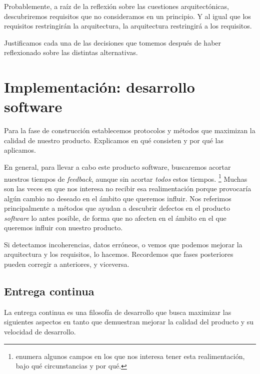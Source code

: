 Probablemente, a raíz de la reflexión sobre las cuestiones arquitectónicas, descubriremos
requisitos que no consideramos en un principio. Y al igual que los requisitos restringirán la arquitectura, la arquitectura
restringirá a los requisitos.

Justificamos cada una de las decisiones que tomemos después de haber reflexionado sobre las
distintas alternativas. 


\section{Implementación: desarrollo software}

Para la fase de construcción establecemos protocolos y métodos que maximizan
la calidad de nuestro producto. Explicamos en qué consisten y por qué las
aplicamos.

En general, para llevar a cabo este producto software, buscaremos acortar nuestros
tiempos de \textit{feedback}, aunque sin acortar \textit{todos} estos tiempos.%
\footnote{%
    \cite[Chapter 5: Feedback]{ModernSoftwareEngineering} enumera algunos campos en los
    que nos interesa tener esta realimentación, bajo qué circunstancias y por qué.
}%
 Muchas son las
veces en que nos interesa no recibir esa realimentación porque provocaría
algún cambio no deseado en el ámbito que queremos influir. Nos referimos
principalmente a métodos que ayudan a descubrir defectos en el producto
\textit{software} lo antes posible, de forma que no afecten en el ámbito en el que
queremos influir con nuestro producto.

Si detectamos incoherencias, datos erróneos, o vemos que podemos mejorar
la arquitectura y los requisitos, lo hacemos. Recordemos que fases posteriores
pueden corregir a anteriores, y viceversa.

\subsection{Entrega continua}

La entrega continua es una filosofía de desarrollo que busca maximizar las
siguientes aspectos en tanto que demuestran mejorar la calidad del producto
y su velocidad de desarrollo. \cite{ModernSoftwareEngineering} \cite{minimumViableCD} \cite{ContinuousDelivery} \cite{accelerate}

